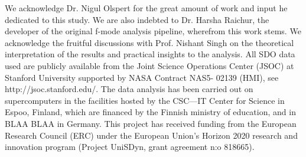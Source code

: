 \documentclass{aa}
\begin{document}
\begin{acknowledgements}
We acknowledge Dr. Nigul Olspert for the great amount of work and input he dedicated to this study. We are also indebted to Dr. Harsha Raichur, the developer of the original f-mode analysis pipeline,  wherefrom this work stems. We acknowledge the fruitful discussions with Prof. Nishant Singh on the theoretical interpretation of the results and practical insights to the analysis.
All SDO data used are publicly available from the Joint Science Operations Center (JSOC) at Stanford University supported by NASA Contract NAS5- 02139 (HMI), see http://jsoc.stanford.edu/. 
The data analysis has been carried out on supercomputers in the facilities hosted by the CSC---IT
Center for Science in Espoo, Finland, which are financed by the
Finnish ministry of education, and in BLAA BLAA in Germany.
This project has received funding from the European Research Council (ERC)
under the European Union's Horizon 2020 research and innovation
program (Project UniSDyn, grant agreement n:o 818665).

\end{acknowledgements}

{}

\end{document}

